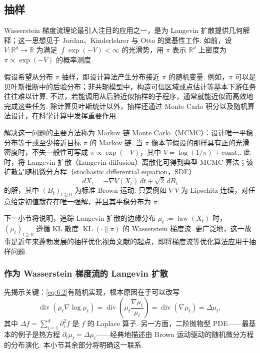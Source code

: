 \subsection{抽样}\label{sec:6.2}

Wasserstein 梯度流理论最引人注目的应用之一，是为 Langevin 扩散提供几何解释；这一思想见于 Jordan、Kinderlehrer 与 Otto 的奠基性工作\cite{ref170}. 如前，设 $V:\mathbb R^d\to\mathbb R$ 为满足 $\int\exp(-V)<\infty$ 的光滑势，用 $\pi$ 表示 $\mathbb R^d$ 上密度为 $\pi\propto\exp(-V)$ 的概率测度.

假设希望从分布 $\pi$ 抽样，即设计算法产生分布接近 $\pi$ 的随机变量. 例如，$\pi$ 可以是贝叶斯推断中的后验分布；非共轭模型中，构造可信区域或点估计等基本下游任务往往难以计算. 不过，若能调用从后验近似抽样的子程序，通常就能近似而高效地完成这些任务. 除计算贝叶斯统计以外，抽样还通过 Monte Carlo 积分以及随机算法设计，在科学计算中发挥重要作用.

解决这一问题的主要方法称为 Markov 链 Monte Carlo（MCMC）：设计唯一平稳分布等于或至少接近目标 $\pi$ 的 Markov 链. 当 $\pi$ 像本节假设的那样具有正的光滑密度时，不失一般性可写成 $\pi\propto\exp(-V)$，其中 $V=\log(1/\pi)+\mathrm{const.}$. 此时，将 Langevin 扩散（Langevin diffusion）离散化可得到典型 MCMC 算法；该扩散是随机微分方程（stochastic differential equation，SDE）
$$
dX_t=-\nabla V(X_t)\,dt+\sqrt2\,dB_t
$$
的解，其中 $(B_t)_{t\geq0}$ 为标准 Brown 运动. 只要例如 $\nabla V$ 为 Lipschitz 连续，对任意给定初值就存在唯一强解，并且其平稳分布为 $\pi$.

下一小节将说明，追踪 Langevin 扩散的边缘分布 $\mu_t:=\operatorname{law}(X_t)$ 时，$(\mu_t)_{t\geq0}$ 遵循 KL 散度 $\operatorname{KL}(\cdot\|\pi)$ 的 Wasserstein 梯度流. 更广泛地，这一故事是近年来蓬勃发展的抽样优化视角文献的起点，即将梯度流等优化算法应用于抽样问题.

\subsubsection{作为 Wasserstein 梯度流的 Langevin 扩散}\label{sec:6.2.1}

先揭示关键：\eqref{eq:6.2}有随机实现，根本原因在于可以改写
$$
\operatorname{div}(\mu_t\nabla\log\mu_t)
=\operatorname{div}\left(\mu_t\frac{\nabla\mu_t}{\mu_t}\right)
=\operatorname{div}(\nabla\mu_t)=\Delta\mu_t,
$$
其中 $\Delta f=\sum_{i=1}^d\partial_i^2f$ 是 $f$ 的 Laplace 算子. 另一方面，二阶抛物型 PDE——最基本的例子是热方程 $\partial_t\mu_t=\Delta\mu_t$——经典地描述由 Brown 运动驱动的随机微分方程的分布演化. 本小节其余部分将明确这一联系.

